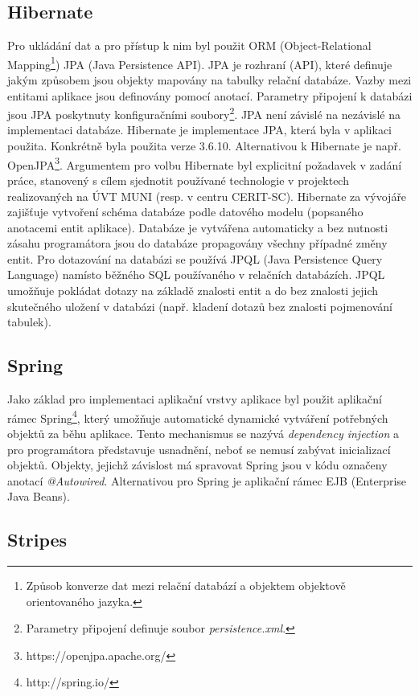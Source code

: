 \subsection{Hibernate}
Pro ukládání dat a pro přístup k nim byl použit ORM (Object-Relational Mapping\footnote{Způsob konverze dat mezi relační databází a objektem objektově orientovaného jazyka.}) JPA (Java Persistence API). JPA je rozhraní (API), které definuje jakým způsobem jsou objekty mapovány na tabulky relační databáze. Vazby mezi entitami aplikace jsou definovány pomocí anotací. Parametry připojení k databázi jsou JPA poskytnuty konfiguračními soubory\footnote{Parametry připojení definuje soubor \textit{persistence.xml}.}. JPA není závislé na nezávislé na implementaci databáze.
Hibernate je implementace JPA, která byla v aplikaci použita. Konkrétně byla použita verze 3.6.10. Alternativou k Hibernate je např. OpenJPA\footnote{https://openjpa.apache.org/}. Argumentem pro volbu Hibernate byl explicitní požadavek v zadání práce, stanovený s cílem sjednotit používané technologie v projektech realizovaných na ÚVT MUNI (resp. v centru CERIT-SC). 
Hibernate za vývojáře zajišťuje vytvoření schéma databáze podle datového modelu (popsaného anotacemi entit aplikace). Databáze je vytvářena automaticky a bez nutnosti zásahu programátora jsou do databáze propagovány všechny případné změny entit. 
Pro dotazování na databázi se používá JPQL (Java Persistence Query Language) namísto běžného SQL používaného v relačních databázích. JPQL umožňuje pokládat dotazy na základě znalosti entit a do bez znalosti jejich skutečného uložení v databázi (např. kladení dotazů bez znalosti pojmenování tabulek).

\subsection{Spring}
Jako základ pro implementaci aplikační vrstvy aplikace byl použit aplikační rámec Spring\footnote{http://spring.io/}, který umožňuje automatické dynamické vytváření potřebných objektů za běhu aplikace. Tento mechanismus se nazývá \textit{dependency injection} a pro programátora představuje usnadnění, neboť se nemusí zabývat inicializací objektů. Objekty, jejichž závislost má spravovat Spring jsou v kódu označeny anotací \textit{@Autowired}.
Alternativou pro Spring je aplikační rámec EJB (Enterprise Java Beans).

\subsection{Stripes}


